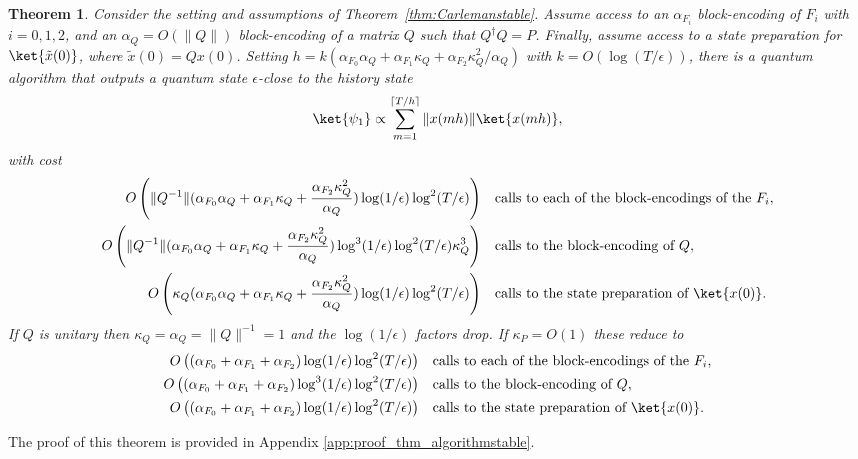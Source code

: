\documentclass[superscriptaddress,onecolumn,nofootinbib,longbibliography,a4paper,accepted=2026-09-29]{quantumarticle}
\theoremstyle{plain}
\newtheorem{thm}{Theorem}
\theoremstyle{definition}
\numberwithin{thm}{section}
\numberwithin{assumption}{section}
\numberwithin{lemma}{section}
\numberwithin{prop}{section}
\numberwithin{cor}{section}
\numberwithin{definition}{section}
\numberwithin{rmk}{section}
\numberwithin{equation}{section}
\newcommand{\lrb}[1]{\left ( #1 \right )}
\newcommand{\myO}[1]{O\lrb{#1}}
\begin{document}
\begin{thm}
\label{thm:algorithmstable}
    Consider the setting and assumptions of Theorem~\ref{thm:Carlemanstable}. Assume access to an $\alpha_{F_i}$ block-encoding of $F_i$ with $i=0,1,2$, and an $\alpha_Q = \myO{\|Q\|}$ block-encoding of a matrix $Q$ such that $Q^\dag Q = P$. Finally, assume access to a state preparation for $\ket{\tilde{x}(0)}$, where $\tilde{x}(0) = Q x(0)$.
    Setting $h = k \left(\alpha_{F_0} \alpha_Q + \alpha_{F_1} \kappa_Q + \alpha_{F_2} \kappa_Q^2/\alpha_Q\right)$ with $k = \myO{\log(T/\epsilon)}$, there is a quantum algorithm that outputs a quantum state $\epsilon$-close to the \emph{ history state}
\begin{align}
    \ket{\psi_1} \propto \sum_{m=1}^{\lceil T/h \rceil} \| x(mh)\| \ket{x(m h)},
\end{align}
    with cost 
\footnotesize
\begin{align}
\myO{\|Q^{-1}\|(\alpha_{F_0} \alpha_Q + \alpha_{F_1} \kappa_Q + \frac{\alpha_{F_2} \kappa_Q^2}{\alpha_Q})\log(1/\epsilon) \log^2(T/\epsilon)} & \quad \textrm{calls to each of the block-encodings of the } F_i, \nonumber \\
\myO{\|Q^{-1}\|(\alpha_{F_0} \alpha_Q + \alpha_{F_1} \kappa_Q + \frac{\alpha_{F_2} \kappa_Q^2}{\alpha_Q})\log^3(1/\epsilon) \log^2(T/\epsilon) \kappa^3_Q} & \quad  \textrm{calls to the block-encoding of } Q, \nonumber \\
 \myO{\kappa_Q (\alpha_{F_0} \alpha_Q + \alpha_{F_1} \kappa_Q + \frac{\alpha_{F_2} \kappa_Q^2}{\alpha_Q})\log(1/\epsilon)\log^2(T/\epsilon)} & \quad \textrm{calls to the state preparation of $\ket{x(0)}$}. 
\end{align}
\normalsize
If $Q$ is unitary then $\kappa_Q = \alpha_Q = \|Q\|^{-1} =1$ and the $\log(1/\epsilon)$ factors drop. If $\kappa_P = \myO{1}$ these reduce to 
\footnotesize
\begin{align}
\myO{(\alpha_{F_0}  + \alpha_{F_1}  + \alpha_{F_2})\log(1/\epsilon) \log^2(T/\epsilon)} & \quad \textrm{calls to each of the block-encodings of the } F_i, \nonumber \\
\myO{(\alpha_{F_0}  + \alpha_{F_1}  + \alpha_{F_2} ) \log^3(1/\epsilon) \log^2(T/\epsilon)} & \quad  \textrm{calls to the block-encoding of } Q, \nonumber \\
 \myO{(\alpha_{F_0}  + \alpha_{F_1}  + \alpha_{F_2})\log(1/\epsilon)\log^2(T/\epsilon)} & \quad \textrm{calls to the state preparation of $\ket{x(0)}$}. 
\end{align}
\normalsize
\end{thm}
The proof of this theorem is provided in Appendix \ref{app:proof_thm_algorithmstable}.
\end{document}

